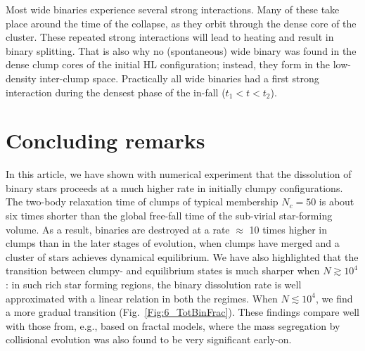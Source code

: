 Most wide binaries experience several strong interactions. Many of these take place around the time of the collapse, as they orbit  through the dense core of the cluster. These repeated strong interactions will lead to heating and result in binary splitting. That is also why no (spontaneous) wide binary was found in  the  dense  clump cores of the initial HL configuration; instead, they form in the low-density inter-clump space. Practically all wide binaries had a first strong interaction during the densest phase of the in-fall ($t_1 < t < t_2$). 



\section{Concluding remarks}


In this article, we have shown with numerical experiment that the dissolution of binary stars proceeds at a much higher rate in initially clumpy configurations. The two-body relaxation time of clumps of typical membership $N_c = 50 $ is about six times shorter than the global free-fall time of the sub-virial star-forming volume. As a result, binaries are destroyed at a rate $\approx $ 10 times higher in clumps than in the later stages of evolution, when clumps have merged and a cluster of stars achieves dynamical equilibrium. We have also highlighted that the transition between clumpy- and equilibrium states is much sharper when $N \gtrsim 10^4$: in such rich star forming regions, the binary dissolution rate is well approximated with a linear relation in both the regimes. When $N \lesssim 10^4$, we find a more gradual transition (Fig.~\ref{Fig:6_TotBinFrac}). These findings  compare well with those from, e.g., \cite{Parker2011} based on fractal models, where the mass segregation by collisional evolution was also found to be very significant early-on. 

